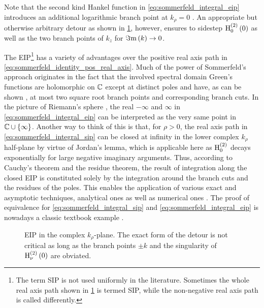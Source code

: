 Note that the second kind Hankel function in \eqref{eq:sommerfeld_integral_eip}
introduces an additional logarithmic branch point at $k_\rho = 0$
\cite{Olver2010}.
An appropriate but otherwise arbitrary detour as shown in \cref{fig:si_paths},
however, ensures to sidestep $\besselh{2}{0} \left(0\right)$ as well as the
two branch points of $k_z$ for $\imag{k} \to 0$.
	
The \ac{EIP}\footnote{The term \acf{SIP} is not used uniformly in the
literature.
Sometimes the whole real axis path shown in \cref{fig:si_paths} is termed
\ac{SIP}, while the non-negative real axis path is called differently.}
has a variety of advantages over the positive real axis path in
\eqref{eq:sommerfeld_identity_pos_real_axis}.
Much of the power of Sommerfeld's approach originates in the fact that the
involved spectral domain Green's functions are holomorphic on $\C$ except at 
distinct poles and have, as can be shown \cite{Michalski2016b}, at most two
square root branch points and corresponding branch cuts.
In the picture of Riemann's sphere \cite[180]{Meyberg2006}, the real
$-\infty$ and $\infty$ in \eqref{eq:sommerfeld_integral_eip} can be interpreted
as the very same point in $\C \cup \left\{\infty\right\}$.
Another way to think of this is that, for $\rho > 0$, the real axis path in
\eqref{eq:sommerfeld_integral_sip} can be closed at infinity in the lower
complex $k_\rho$ half-plane by virtue of Jordan's lemma, which is applicable
here as $\besselh{2}{0}$ decays exponentially for large negative imaginary
arguments.
Thus, according to Cauchy's theorem and the residue theorem, the result of
integration along the closed \ac{EIP} is constituted solely by the integration
around the branch cuts and the residues of the poles.
This enables the application of various exact and asymptotic techniques,
analytical ones as well as numerical ones
\cite{Sommerfeld1964,Chew1999,Michalski1985a,Michalski2016b}.
The proof of equivalence for \eqref{eq:sommerfeld_integral_sip} and
\eqref{eq:sommerfeld_integral_eip} is nowadays a classic textbook example
\cite[203]{Sommerfeld1964}.

\begin{figure}
	\centering
	\caption[\Acf{EIP}]
	{\Acf{EIP} in the complex $k_\rho$-plane.
	The exact form of the detour is not critical as long as the branch points
	$\pm k$ and the singularity of $\besselh{2}{\nu} \left(0\right)$ are
	obviated.}
	\label{fig:si_paths}
\end{figure}

